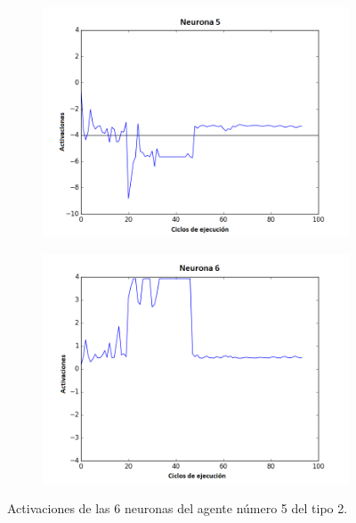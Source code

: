 \begin{figure}[!h]
\begin{subfigure}{0.33\textwidth}
  \includegraphics[width=\linewidth]{Imagenes/Agente2Activaciones/Agente4/Neurona4}
\end{subfigure}\hfil %
\begin{subfigure}{0.33\textwidth}
  \includegraphics[width=\linewidth]{Imagenes/Agente2Activaciones/Agente4/Neurona5}
\end{subfigure}
\caption{Activaciones de las 6 neuronas del agente número 5 del tipo 2.}
\end{figure}
